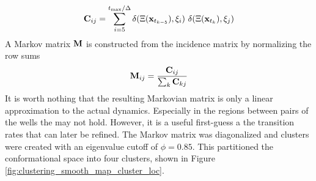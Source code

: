 \begin{equation}
  \B{C}_{ij} = 
  \sum_{i=5}^{ {t_{\text{max}}}/{\Delta}} \delta(\Xi(\B{x}_{t_{k-5}}),  \xi_i) \ \delta(\Xi(\B{x}_{t_{k}}),  \xi_j)
\end{equation}
%
A Markov matrix ${\bf M}$ is constructed from the incidence matrix by normalizing the row sums
\begin{equation}
  {\bf M}_{ij} = \frac{ {\bf C}_{ij} } {\sum_k {\bf C}_{kj}}
\end{equation}
%
It is worth nothing that the resulting Markovian matrix is only a linear approximation to the actual dynamics. Especially in the regions between pairs of the wells the may not hold. However, it is a useful first-guess a the transition rates that can later be refined. The Markov matrix was diagonalized and clusters were created with an eigenvalue cutoff of $\phi = 0.85$. This partitioned the conformational space into four clusters, shown in Figure \ref{fig:clustering_smooth_map_cluster_loc}.

